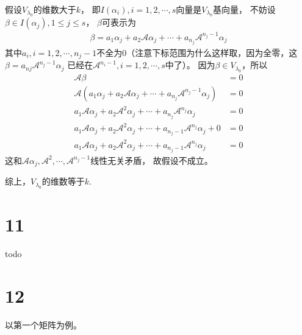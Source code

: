\documentclass{article}
\begin{document}
假设$V_{\lambda_0}$的维数大于$k$，
即$I(\alpha_i), i = 1, 2, \cdots, s$向量是$V_{\lambda_0}$基向量，
不妨设$\beta \in I(\alpha_j), 1 \leq j \leq s$，
$\beta$可表示为
\begin{align*}
  \beta = a_1 \alpha_j + a_2 \mathscr{A} \alpha_j + \cdots + a_{n_j} \mathscr{A}^{n_j - 1} \alpha_j
\end{align*}
其中$a_i, i = 1, 2, \cdots, n_j - 1$不全为0（注意下标范围为什么这样取，因为全零，这$\beta = a_{nj}\mathscr{A}^{n_j - 1} \alpha_j$
已经在$\mathscr{A}^{n_i - 1}, i = 1, 2, \cdots, s$中了）。
因为$\beta \in V_{\lambda_0}$，所以
\begin{align*}
  \mathscr{A} \beta                                                                                           & = 0  \\
  \mathscr{A} (a_1 \alpha_j + a_2 \mathscr{A} \alpha_j + \cdots + a_{n_j} \mathscr{A}^{n_j - 1} \alpha_j)     & = 0  \\
  a_1 \mathscr{A} \alpha_j + a_2 \mathscr{A}^2 \alpha_j + \cdots + a_{n_j} \mathscr{A}^{n_j} \alpha_j         & = 0  \\
  a_1 \mathscr{A} \alpha_j + a_2 \mathscr{A}^2 \alpha_j + \cdots + a_{n_j - 1} \mathscr{A}^{n_j} \alpha_j + 0 & =  0 \\
  a_1 \mathscr{A} \alpha_j + a_2 \mathscr{A}^2 \alpha_j + \cdots + a_{n_j - 1} \mathscr{A}^{n_j} \alpha_j     & = 0
\end{align*}
这和$\mathscr{A} \alpha_j, \mathscr{A}^2, \cdots, \mathscr{A}^{n_j - 1}$线性无关矛盾，
故假设不成立。

综上，$V_{\lambda_0}$的维数等于$k$.

\section*{11}

todo

\section*{12}

以第一个矩阵为例。
\end{document}
